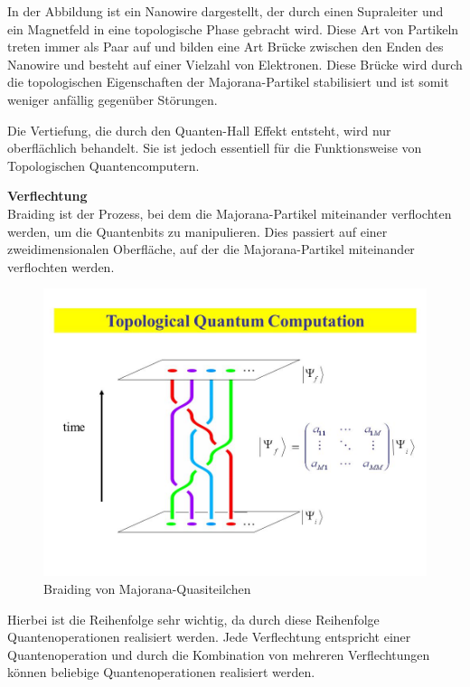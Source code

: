 In der Abbildung ist ein Nanowire dargestellt, der durch einen Supraleiter und ein Magnetfeld in eine topologische Phase gebracht wird.
Diese Art von Partikeln treten immer als Paar auf und bilden eine Art Brücke zwischen den Enden des Nanowire und besteht auf einer Vielzahl von Elektronen.
Diese Brücke wird durch die topologischen Eigenschaften der Majorana-Partikel stabilisiert und ist somit weniger anfällig gegenüber Störungen.\\


\begin{tcolorbox}[title=Kommentar,
    title filled=false,
    colback=cyan!5!white,
    colframe=cyan!75!black]
    Die Vertiefung, die durch den Quanten-Hall Effekt entsteht, wird nur oberflächlich behandelt. Sie ist jedoch essentiell für die Funktionsweise von Topologischen Quantencomputern.
\end{tcolorbox}

\textbf{Verflechtung}\\
Braiding ist der Prozess, bei dem die Majorana-Partikel miteinander verflochten werden, um die Quantenbits zu manipulieren. 
Dies passiert auf einer zweidimensionalen Oberfläche, auf der die Majorana-Partikel miteinander verflochten werden.\\

\begin{figure}[H]
    \centering
    \includegraphics[width=0.75\linewidth]{img/TQC.png}
    \caption{Braiding von Majorana-Quasiteilchen}
    \label{fig:Braiding}
\end{figure}

Hierbei ist die Reihenfolge sehr wichtig, da durch diese Reihenfolge Quantenoperationen realisiert werden.
Jede Verflechtung entspricht einer Quantenoperation und durch die Kombination von mehreren Verflechtungen können beliebige Quantenoperationen realisiert werden.\\

